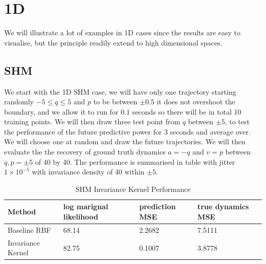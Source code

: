 \documentclass{statsmsc}
\begin{document}
\section{1D}
We will illustrate a lot of examples in 1D cases since the results are easy to visualise, but the principle readily extend to high dimensional spaces. 

\subsection{SHM}
We start with the 1D SHM case, we will have only one trajectory starting randomly $-5\le q\le5$ and $p$ to be between $\pm 0.5$ it does not overshoot the boundary, and we allow it to run for $0.1$ seconds so there will be in total 10 training points. 
We will then draw three test point from $q$ between $\pm 5$, to test the performance of the future predictive power for 3 seconds and average over. 
We will choose one at random and draw the future trajectories.
We will then evaluate the the recovery of ground truth dynamics $a=-q$ and $v=p$ between $q, p=\pm 5$ of 40 by 40.
The performance is summarised in table with jitter $1\times 10^{-5}$ with invariance density of 40 within $\pm 5$. 
\begin{table}[H]
  \centering
  \begin{tabular}{l l l l }
\hline
Method           & log marignal likelihood & prediction MSE &  true dynamics  MSE\\
                    \hline
Baseline RBF & 68.14 & 2.2682 & 7.5111 \\
Invariance Kernel & 82.75 & 0.1007 & 3.8778 \\
\hline
  \end{tabular}
  \caption{SHM Invariance Kernel Performance}
  \label{tab:shm_performance}
\end{table}
\end{document}
